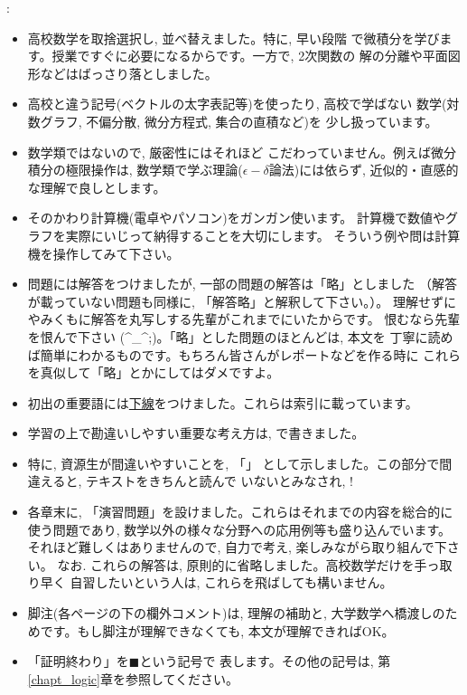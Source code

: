 :　
\begin{itemize}
\item 高校数学を取捨選択し, 並べ替えました。特に, 早い段階
で微積分を学びます。授業ですぐに必要になるからです。一方で, 2次関数の
解の分離や平面図形などはばっさり落としました。

\item 高校と違う記号(ベクトルの太字表記等)を使ったり, 高校で学ばない
数学(対数グラフ, 不偏分散, 微分方程式, 集合の直積など)を
少し扱っています。

\item 数学類ではないので, 厳密性にはそれほど
こだわっていません。例えば微分積分の極限操作は, 
数学類で学ぶ理論($\epsilon-\delta$論法)には依らず, 
近似的・直感的な理解で良しとします。

\item そのかわり計算機(電卓やパソコン)をガンガン使います。
計算機で数値やグラフを実際にいじって納得することを大切にします。
そういう例や問は計算機を操作してみて下さい。

\item 問題には解答をつけましたが, 一部の問題の解答は「略」としました
（解答が載っていない問題も同様に, 「解答略」と解釈して下さい。）。
理解せずにやみくもに解答を丸写しする先輩がこれまでにいたからです。
恨むなら先輩を恨んで下さい (\^{}\_\^{};)。「略」とした問題のほとんどは, 本文を
丁寧に読めば簡単にわかるものです。もちろん皆さんがレポートなどを作る時に
これらを真似して「略」とかにしてはダメですよ。

\item 初出の重要語には\underline{下線}をつけました。これらは索引に載っています。

\item 学習の上で勘違いしやすい重要な考え方は, で書きました。

\item 特に, 資源生が間違いやすいことを, 「」
として示しました。この部分で間違えると, テキストをきちんと読んで
いないとみなされ, !

\item 各章末に, 「演習問題」を設けました。これらはそれまでの内容を総合的に
使う問題であり, 数学以外の様々な分野への応用例等も盛り込んでいます。
それほど難しくはありませんので, 自力で考え, 楽しみながら取り組んで下さい。
なお. これらの解答は, 原則的に省略しました。高校数学だけを手っ取り早く
自習したいという人は, これらを飛ばしても構いません。

\item 脚注(各ページの下の欄外コメント)は, 理解の補助と, 
大学数学へ橋渡しのためです。もし脚注が理解できなくても, 
本文が理解できればOK。

\item 「証明終わり」を$\blacksquare$という記号で
表します。その他の記号は, 第\ref{chapt_logic}章を参照してください。
\end{itemize}

